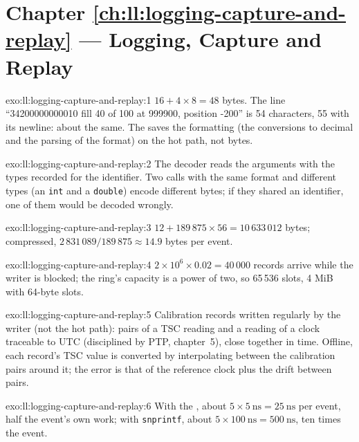 \section*{Chapter \ref{ch:ll:logging-capture-and-replay} --- Logging, Capture and Replay}

\begin{solution}{exo:ll:logging-capture-and-replay:1}
$16 + 4 \times 8 = 48$ bytes. The line ``34200000000010 fill 40 of 100 at 999900, position -200'' is 54 characters, 55 with its
newline: about the same. The  saves the formatting (the conversions to decimal and the parsing of the format) on
the hot path, not bytes.
\end{solution}

\begin{solution}{exo:ll:logging-capture-and-replay:2}
The decoder reads the arguments with the types recorded for the identifier. Two calls with the same format and different
types (an \texttt{int} and a \texttt{double}) encode different bytes; if they shared an identifier, one of them would be
decoded wrongly.
\end{solution}

\begin{solution}{exo:ll:logging-capture-and-replay:3}
$12 + 189\,875 \times 56 = 10\,633\,012$ bytes; compressed, $2\,831\,089 / 189\,875 \approx 14.9$ bytes per event.
\end{solution}

\begin{solution}{exo:ll:logging-capture-and-replay:4}
$2 \times 10^6 \times 0.02 = 40\,000$ records arrive while the writer is blocked; the ring's capacity is a power of two, so
65\,536 slots, 4 MiB with 64-byte slots.
\end{solution}

\begin{solution}{exo:ll:logging-capture-and-replay:5}
Calibration records written regularly by the writer (not the hot path): pairs of a TSC reading and a reading of a clock
traceable to UTC (disciplined by PTP, chapter~5), close together in time. Offline, each record's TSC value is converted by
interpolating between the calibration pairs around it; the error is that of the reference clock plus the drift between pairs.
\end{solution}

\begin{solution}{exo:ll:logging-capture-and-replay:6}
With the , about $5 \times \qty{5}{\nano\second} = \qty{25}{\nano\second}$ per event, half the event's own work; with
\texttt{snprintf}, about $5 \times \qty{100}{\nano\second} = \qty{500}{\nano\second}$, ten times the event.
\end{solution}

